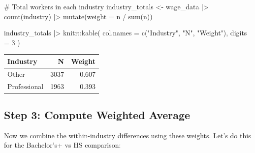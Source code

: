 \documentclass[
  letterpaper,
  DIV=11,
  numbers=noendperiod]{scrreprt}
\newenvironment{Shaded}{\begin{snugshade}}{\end{snugshade}}
\newcommand{\AttributeTok}[1]{\textcolor[rgb]{0.40,0.45,0.13}{#1}}
\newcommand{\CommentTok}[1]{\textcolor[rgb]{0.37,0.37,0.37}{#1}}
\newcommand{\DecValTok}[1]{\textcolor[rgb]{0.68,0.00,0.00}{#1}}
\newcommand{\FunctionTok}[1]{\textcolor[rgb]{0.28,0.35,0.67}{#1}}
\newcommand{\NormalTok}[1]{\textcolor[rgb]{0.00,0.23,0.31}{#1}}
\newcommand{\OtherTok}[1]{\textcolor[rgb]{0.00,0.23,0.31}{#1}}
\newcommand{\SpecialCharTok}[1]{\textcolor[rgb]{0.37,0.37,0.37}{#1}}
\newcommand{\StringTok}[1]{\textcolor[rgb]{0.13,0.47,0.30}{#1}}
\newcounter{none} %
\begin{document}
\begin{Shaded}
\begin{Highlighting}[]
\CommentTok{\# Total workers in each industry}
\NormalTok{industry\_totals }\OtherTok{\textless{}{-}}\NormalTok{ wage\_data }\SpecialCharTok{|\textgreater{}}
  \FunctionTok{count}\NormalTok{(industry) }\SpecialCharTok{|\textgreater{}}
  \FunctionTok{mutate}\NormalTok{(}\AttributeTok{weight =}\NormalTok{ n }\SpecialCharTok{/} \FunctionTok{sum}\NormalTok{(n))}

\NormalTok{industry\_totals }\SpecialCharTok{|\textgreater{}}
\NormalTok{  knitr}\SpecialCharTok{::}\FunctionTok{kable}\NormalTok{(}
    \AttributeTok{col.names =} \FunctionTok{c}\NormalTok{(}\StringTok{"Industry"}\NormalTok{, }\StringTok{"N"}\NormalTok{, }\StringTok{"Weight"}\NormalTok{),}
    \AttributeTok{digits =} \DecValTok{3}
\NormalTok{  )}
\end{Highlighting}
\end{Shaded}

{\def\LTcaptype{none} %
\begin{longtable}[]{@{}lrr@{}}
\toprule\noalign{}
Industry & N & Weight \\
\midrule\noalign{}
\endhead
\bottomrule\noalign{}
\endlastfoot
Other & 3037 & 0.607 \\
Professional & 1963 & 0.393 \\
\end{longtable}
}

\subsection{Step 3: Compute Weighted
Average}\label{step-3-compute-weighted-average}

Now we combine the within-industry differences using these weights.
Let's do this for the Bachelor's+ vs HS comparison:

\begin{Shaded}
\end{Shaded}
\end{document}
